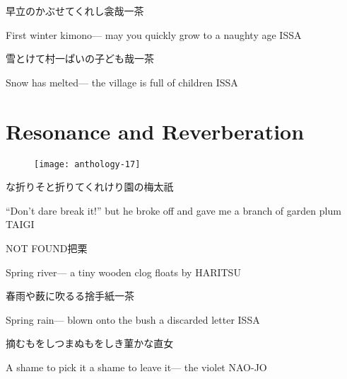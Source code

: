 \begin{haiku}
    {\FH 早立のかぶせてくれし衾哉}\hfill{\FH 一茶}

    \vin{} First winter kimono---
    \vin{} \vin{} may you quickly grow to
    \vin{} \vin{} \vin{} a naughty age \hspace{\fill} ISSA
\end{haiku}

\begin{haiku}
    {\FH 雪とけて村一ぱいの子ども哉}\hfill{\FH 一茶}

    \vin{} Snow has melted---
    \vin{} \vin{} the village is full
    \vin{} \vin{} \vin{} of children \hspace{\fill} ISSA
\end{haiku}

\chapter{Resonance and Reverberation}

\begin{figure}
    \texttt{[image: anthology-17]}
\end{figure}

\begin{haiku}
    {\FH な折りそと折りてくれけり園の梅}\hfill{\FH 太祇}

    \vin{} ``Don't dare break it!''
    \vin{} \vin{} but he broke off and gave me
    \vin{} \vin{} \vin{} a branch of garden plum \hspace{\fill} TAIGI
\end{haiku}

\begin{haiku}
    NOT FOUND\hfill{\FH 把栗}

    \vin{} Spring river---
    \vin{} \vin{} a tiny wooden clog
    \vin{} \vin{} \vin{} floats by \hspace{\fill} HARITSU
\end{haiku}

\begin{haiku}
    {\FH 春雨や薮に吹るる捨手紙}\hfill{\FH 一茶}

    \vin{} Spring rain---
    \vin{} \vin{} blown onto the bush
    \vin{} \vin{} \vin{} a discarded letter \hspace{\fill} ISSA
\end{haiku}

\begin{haiku}
    {\FH 摘むもをしつまぬもをしき菫かな}\hfill{\FH 直女}

    \vin{} A shame to pick it
    \vin{} \vin{} a shame to leave it---
    \vin{} \vin{} \vin{} the violet \hspace{\fill} NAO-JO
\end{haiku}

